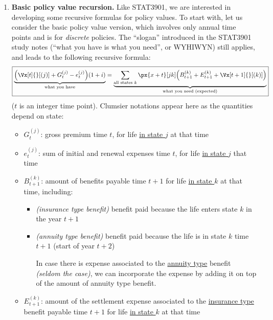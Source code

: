 \begin{enumerate}
\item \label{it:mult-state-basic-policy-val-recurs} \textbf{Basic policy value
recursion.} Like STAT3901, we are interested in developing some recursive
formulas for policy values. To start with, let us consider the basic policy
value version, which involves only annual time points and is for
\emph{discrete} policies.  The ``slogan'' introduced in the STAT3901 study
notes (``what you have is what you need'', or WYHIWYN) still applies, and leads
to the following recursive formula:
\[
\boxed{\underbrace{\qty(\Vx[t]{}[(j)]+G_t^{(j)}-e_t^{(j)})(1+i)}_{\text{what you have}}
=\underbrace{\sum_{\text{all states \(k\)}}^{}\px{x+t}[jk]
\qty(B_{t+1}^{(k)}+E_{t+1}^{(k)}+\Vx[t+1]{}[(k)])}_{\text{what you need (expected)}}}
\]
(\(t\) is an integer time point). Clumsier notations appear here as the
quantities depend on state:
\begin{itemize}
\item \(G_t^{(j)}\): gross premium  time \(t\), for life
\underline{in state \(j\)} at that time
\item \(e_t^{(j)}\): sum of initial and renewal expenses  time
\(t\), for life \underline{in state \(j\)}  that time
\item \(B_{t+1}^{(k)}\): amount of benefits payable  time \(t+1\) for
life \underline{in state \(k\)} at that time, including: \warn{}
\begin{itemize}
\item \emph{(insurance type benefit)} benefit paid because the life enters state \(k\) in the year \(t+1\)
\item \emph{(annuity type benefit)} benefit paid because the life is in state
\(k\)  time \(t+1\) (start of year \(t+2\))
\begin{note}
In case there is expense associated to the \underline{annuity type} benefit
\emph{(seldom the case)}, we can incorporate the expense by adding it on top of
the amount of annuity type benefit.
\end{note}
\end{itemize}
\item \(E_{t+1}^{(k)}\): amount of the settlement expense associated to the
\underline{insurance type} benefit payable  time \(t+1\) for life
\underline{in state \(k\)} at that time
\end{itemize}


\end{enumerate}
